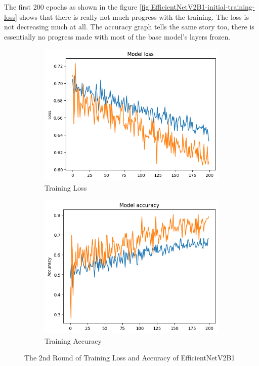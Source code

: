 \documentclass[]{final_report}
\begin{document}
The first 200 epochs as shown in the figure \ref{fig:EfficientNetV2B1-initial-training-loss} shows that there is really not much progress with the training. The loss is not decreasing much at all. The accuracy graph tells the same story too, there is essentially no progress made with most of the base model's layers frozen.


\begin{figure}[ht!]
  \centering
  \begin{subfigure}{0.4\textwidth}
    \includegraphics[width=\linewidth]{images/EfficientNetV2B1-2nd-training-loss.png}
    \caption{Training Loss}
    \label{fig:EfficientNetV2B1-2nd-training-loss}
  \end{subfigure}
  \begin{subfigure}{0.4\textwidth}
    \includegraphics[width=\linewidth]{images/EfficientNetV2B1-2nd-training-accuracy.png}
    \caption{Training Accuracy}
    \label{fig:EfficientNetV2B1-2nd-training-accuracy}
  \end{subfigure}
  \caption{The 2nd Round of Training Loss and Accuracy of EfficientNetV2B1}
  \label{fig:EfficientNetV2B1-2nd-training}
\end{figure}
\end{document}

